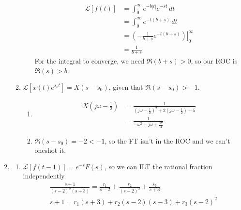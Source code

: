 \documentclass[12pt]{article}
\newcommand{\lt}[1]{\mathcal{L}\left[#1\right]}
\begin{document}
\begin{enumerate}
\begin{enumerate}
\begin{enumerate}
\[\begin{aligned}
                                                \lt{f(t)}
                                                 & = \int_{0}^{\infty} e^{-b|t|}e^{-st}\,dt                       \\
                                                 & = \int_{0}^{\infty} e^{-t(b+s)}\,dt                            \\
                                                 & = \left.\left(-\frac{1}{b+s}e^{-t(b+s)}\right)\right|^\infty_0 \\
                                                 & = \boxed{\frac{1}{b+s}}
                                          \end{aligned}\]
                                    For the integral to converge, we need $\Re(b+s)>0$,
                                    so our ROC is $\boxed{\Re(s)>b}$.
                        \end{enumerate}
                  \item $\lt{x(t)e^{s_0t}}=X(s-s_0)$, given that $\Re(s-s_0)>-1$.
                        \begin{enumerate}
                              \item \[\begin{aligned}
                                                X\left(j\omega-\frac{1}{2}\right)
                                                 & = \frac{1}{\left(j\omega-\frac{1}{2}\right)^2+2\left(j\omega-\frac{1}{2}\right)+5} \\
                                                 & = \boxed{\frac{1}{-\omega^2+j\omega+\frac{17}{4}}}
                                          \end{aligned}\]
                              \item $\Re(s-s_0)=-2 < -1$, so the FT isn't in the ROC and we can't oneshot it.
                        \end{enumerate}
            \end{enumerate}
      \item \begin{enumerate}
                  \item $\lt{f(t-1)}=e^{-s}F(s)$,
                        so we can ILT the rational fraction independently.
                        \begin{gather*}
                              \frac{s+1}{(s-2)^2(s+3)} = \frac{r_1}{s-2}+\frac{r_2}{(s-2)^2}+\frac{s_3}{s+3} \\
                              s+1=r_1(s+3)+r_2(s-2)(s-3)+r_3(s-2)^2 \\

\end{gather*}
\end{enumerate}
\end{enumerate}
\end{document}
